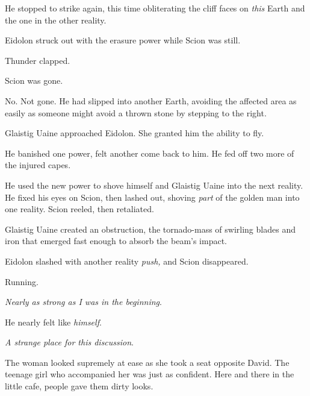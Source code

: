 He stopped to strike again, this time obliterating the cliff faces on \emph{this} Earth and the one in the other reality.



Eidolon struck out with the erasure power while Scion was still.



Thunder clapped.



Scion was gone.



No.  Not gone.  He had slipped into another Earth, avoiding the affected area as easily as someone might avoid a thrown stone by stepping to the right.



Glaistig Uaine approached Eidolon.  She granted him the ability to fly.



He banished one power, felt another come back to him.  He fed off two more of the injured capes.



He used the new power to shove himself and Glaistig Uaine into the next reality.  He fixed his eyes on Scion, then lashed out, shoving \emph{part} of the golden man into one reality.  Scion reeled, then retaliated.



Glaistig Uaine created an obstruction, the tornado-mass of swirling blades and iron that emerged fast enough to absorb the beam's impact.



Eidolon slashed with another reality \emph{push, }and Scion disappeared.



Running.



\emph{Nearly as strong as I was in the beginning}.



He nearly felt like \emph{himself}.



\sectionbreak






\emph{A strange place for this discussion}.



The woman looked supremely at ease as she took a seat opposite David.  The teenage girl who accompanied her was just as confident.  Here and there in the little cafe, people gave them dirty looks.



